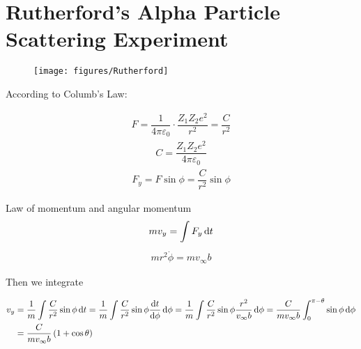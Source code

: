 
\chapter{Rutherford's Alpha Particle Scattering Experiment}

\begin{figure}[H]
  \centering
  \texttt{[image: figures/Rutherford]}
  \label{fig:}
\end{figure}

According to Columb's Law:

\begin{equation*}
  \begin{aligned}
    F = \dfrac{1}{4 \pi \varepsilon_0} \cdot \dfrac{Z_1 Z_2 e^2}{r^2} = \dfrac{C}{r^2}
  \end{aligned}
\end{equation*}
\begin{equation*}
  \begin{aligned}
    C = \dfrac{Z_1 Z_2 e^2}{4 \pi \varepsilon_0} 
  \end{aligned}
\end{equation*}
\begin{equation*}
  \begin{aligned}
    F_y = F \sin \phi = \dfrac{C}{r^2} \sin \phi 
  \end{aligned}
\end{equation*}

Law of momentum and angular momentum
\begin{equation*}
  \begin{aligned}
    m v_y = \int F_y \mathop{}\!\mathrm{d} t
  \end{aligned}
\end{equation*}
\begin{equation*}
  \begin{aligned}
    m r^2 \dot{\phi} = m v_{\infty} b
  \end{aligned}
\end{equation*}

Then we integrate

\begin{equation*}
  \begin{aligned}
    v_y &= \dfrac{1}{m} \int \dfrac{C}{r^2} \sin \phi \mathop{}\!\mathrm{d} t
    = \dfrac{1}{m} \int \dfrac{C}{r^2} \sin \phi \dfrac{\mathop{}\!\mathrm{d} t}{\mathop{}\!\mathrm{d} \phi} \mathop{}\!\mathrm{d} \phi 
    = \dfrac{1}{m} \int \dfrac{C}{r^2} \sin \phi \dfrac{r^2}{v_{\infty} b}  \mathop{}\!\mathrm{d} \phi
    = \dfrac{C}{m v_{\infty} b} \int_0^{\pi - \theta} \sin \phi \mathop{}\!\mathrm{d} \phi\\
    &= \dfrac{C}{m v_{\infty} b} \left( 1 + \cos \theta \right) 
  \end{aligned}
\end{equation*}

